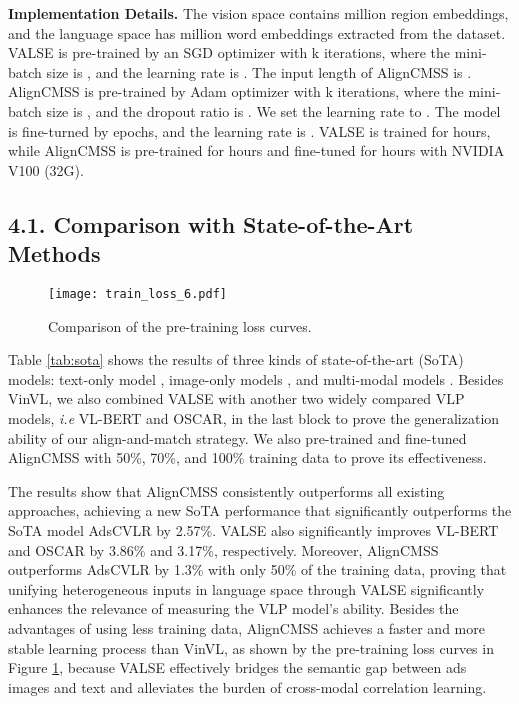 \documentclass[letterpaper]{article} \usepackage{aaai24}  \usepackage{times}  \usepackage{helvet}  \usepackage{courier}  \usepackage[hyphens]{url}  \usepackage{graphicx} \urlstyle{rm} \def\UrlFont{\rm}  \usepackage{natbib}  \usepackage{caption} \frenchspacing  \setlength{\pdfpagewidth}{8.5in}  \setlength{\pdfpageheight}{11in}
\begin{document}
\noindent\textbf{Implementation Details.}
The vision space contains  million region embeddings, and the language space has  million word embeddings extracted from the dataset. VALSE is pre-trained by an SGD optimizer with k iterations, where the mini-batch size is , and the learning rate is . The input length of AlignCMSS is . AlignCMSS is pre-trained by Adam optimizer with k iterations, where the mini-batch size is , and the dropout ratio is . We set the learning rate to . The model is fine-turned by  epochs, and the learning rate is . VALSE is trained for  hours, while AlignCMSS is pre-trained for  hours and fine-tuned for  hours with  NVIDIA V100 (32G). 

\subsection{4.1. Comparison with State-of-the-Art Methods}

 \begin{figure}[t]

    \centering
    \texttt{[image: train\_loss\_6.pdf]}
    \caption{Comparison of the pre-training loss curves.}
    \vspace{-5pt}
    \label{fig:loss}

\end{figure}

Table \ref{tab:sota} shows the results of three kinds of state-of-the-art (SoTA) models: text-only model \cite{devlin2019bert},  image-only models \cite{radford2021learning, pmlr-v139-kim21k, Li_Duan_Fang_Gong_Jiang_2020}, and multi-modal models \cite{su2020vl-bert, li2020oscar, 10.1145/3503161.3548226, zhang2021vinvl, NEURIPS2021_50525975, pmlr-v162-li22n}. Besides VinVL, we also combined VALSE with another two widely compared VLP models, \textit{i.e} VL-BERT and OSCAR, in the last block to prove the generalization ability of our align-and-match strategy. We also pre-trained and fine-tuned AlignCMSS with 50\%, 70\%, and 100\% training data to prove its effectiveness.

The results show that AlignCMSS consistently outperforms all existing approaches, achieving a new SoTA performance that significantly outperforms the SoTA model AdsCVLR by 2.57\%. VALSE also significantly improves VL-BERT and OSCAR by 3.86\% and 3.17\%, respectively. Moreover, AlignCMSS outperforms AdsCVLR by 1.3\% with only 50\% of the training data, proving that unifying heterogeneous inputs in language space through VALSE significantly enhances the relevance of measuring the VLP model's ability.
Besides the advantages of using less training data, AlignCMSS achieves a faster and more stable learning process than VinVL, as shown by the pre-training loss curves in Figure \ref{fig:loss}, because VALSE effectively bridges the semantic gap between ads images and text and alleviates the burden of cross-modal correlation learning.
\end{document}
